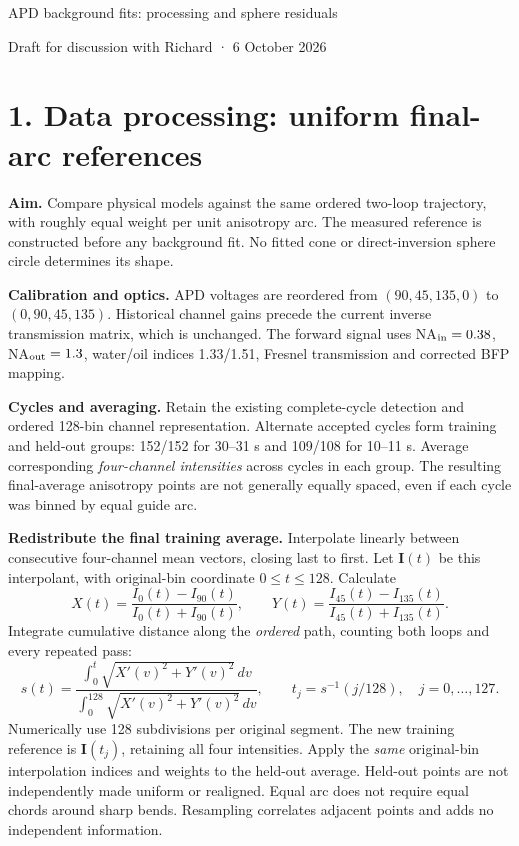 \documentclass[10pt,a4paper]{article}
\begin{document}
{\LARGE APD background fits: processing and sphere residuals}\par
Draft for discussion with Richard · 6 October 2026

\section*{1. Data processing: uniform final-arc references}
\textbf{Aim.} Compare physical models against the same ordered two-loop trajectory, with roughly equal weight per unit anisotropy arc. The measured reference is constructed before any background fit. No fitted cone or direct-inversion sphere circle determines its shape.

\textbf{Calibration and optics.} APD voltages are reordered from $(90,45,135,0)$ to $(0,90,45,135)$. Historical channel gains precede the current inverse transmission matrix, which is unchanged. The forward signal uses NA$_{\rm in}=0.38$, NA$_{\rm out}=1.3$, water/oil indices 1.33/1.51, Fresnel transmission and corrected BFP mapping.

\textbf{Cycles and averaging.} Retain the existing complete-cycle detection and ordered 128-bin channel representation. Alternate accepted cycles form training and held-out groups: 152/152 for 30--31 s and 109/108 for 10--11 s. Average corresponding \emph{four-channel intensities} across cycles in each group. The resulting final-average anisotropy points are not generally equally spaced, even if each cycle was binned by equal guide arc.

\textbf{Redistribute the final training average.} Interpolate linearly between consecutive four-channel mean vectors, closing last to first. Let $\mathbf I(t)$ be this interpolant, with original-bin coordinate $0\leq t\leq128$. Calculate
\[
X(t)=\frac{I_0(t)-I_{90}(t)}{I_0(t)+I_{90}(t)},\qquad
Y(t)=\frac{I_{45}(t)-I_{135}(t)}{I_{45}(t)+I_{135}(t)}.
\]
Integrate cumulative distance along the \emph{ordered} path, counting both loops and every repeated pass:
\[
s(t)=\frac{\int_0^t\sqrt{X'(v)^2+Y'(v)^2}\,dv}
{\int_0^{128}\sqrt{X'(v)^2+Y'(v)^2}\,dv},\qquad
 t_j=s^{-1}(j/128),\quad j=0,\ldots,127.
\]
Numerically use 128 subdivisions per original segment. The new training reference is $\mathbf I(t_j)$, retaining all four intensities. Apply the \emph{same} original-bin interpolation indices and weights to the held-out average. Held-out points are not independently made uniform or realigned. Equal arc does not require equal chords around sharp bends. Resampling correlates adjacent points and adds no independent information.
\end{document}
